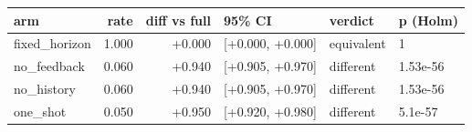 \begin{tabular}{lrrlll}
\toprule
arm & rate & diff vs full & 95\% CI & verdict & p (Holm) \\
\midrule
fixed\_horizon & 1.000 & +0.000 & [+0.000, +0.000] & equivalent & 1 \\
no\_feedback & 0.060 & +0.940 & [+0.905, +0.970] & different & 1.53e-56 \\
no\_history & 0.060 & +0.940 & [+0.905, +0.970] & different & 1.53e-56 \\
one\_shot & 0.050 & +0.950 & [+0.920, +0.980] & different & 5.1e-57 \\
\bottomrule
\end{tabular}
